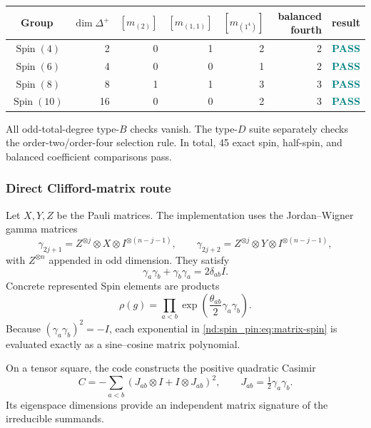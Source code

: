 \documentclass[10pt]{article}
\begin{document}
\begin{center}
\begin{tabular}{@{}c@{\quad}r@{\quad}rrrr@{\quad}c@{}}
\toprule
Group&$\dim\Delta^+$&$[m_{(2)}]$&$[m_{(1,1)}]$&$[m_{(1^4)}]$&balanced fourth&result\\
\midrule
$\operatorname{Spin}(4)$&2&0&1&2&2&\textcolor{teal}{\textbf{PASS}}\\
$\operatorname{Spin}(6)$&4&0&0&1&2&\textcolor{teal}{\textbf{PASS}}\\
$\operatorname{Spin}(8)$&8&1&1&3&3&\textcolor{teal}{\textbf{PASS}}\\
$\operatorname{Spin}(10)$&16&0&0&2&3&\textcolor{teal}{\textbf{PASS}}\\
\bottomrule
\end{tabular}
\end{center}

All odd-total-degree type-$B$ checks vanish.  The type-$D$ suite separately
checks the order-two/order-four selection rule.  In total, 45 exact spin,
half-spin, and balanced coefficient comparisons pass.

\subsubsection{Direct Clifford-matrix route}

Let $X,Y,Z$ be the Pauli matrices.  The implementation uses the
Jordan--Wigner gamma matrices
\[
 \gamma_{2j+1}=Z^{\otimes j}\otimes X\otimes I^{\otimes(n-j-1)},\qquad
 \gamma_{2j+2}=Z^{\otimes j}\otimes Y\otimes I^{\otimes(n-j-1)},
\]
with $Z^{\otimes n}$ appended in odd dimension.  They satisfy
\[
 \gamma_a\gamma_b+\gamma_b\gamma_a=2\delta_{ab}I.
\]
Concrete represented Spin elements are products
\begin{equation}\label{nd:spin_pin:eq:matrix-spin}
 \rho(g)=\prod_{a<b}\exp\!\left(
 \frac{\theta_{ab}}2\gamma_a\gamma_b\right).
\end{equation}
Because $(\gamma_a\gamma_b)^2=-I$, each exponential in
\eqref{nd:spin_pin:eq:matrix-spin} is evaluated exactly as a sine--cosine matrix
polynomial.

On a tensor square, the code constructs the positive quadratic Casimir
\[
 C=-\sum_{a<b}\left(J_{ab}\otimes I+I\otimes J_{ab}\right)^2,
 \qquad J_{ab}=\tfrac12\gamma_a\gamma_b.
\]
Its eigenspace dimensions provide an independent matrix signature of the
irreducible summands.
\end{document}
